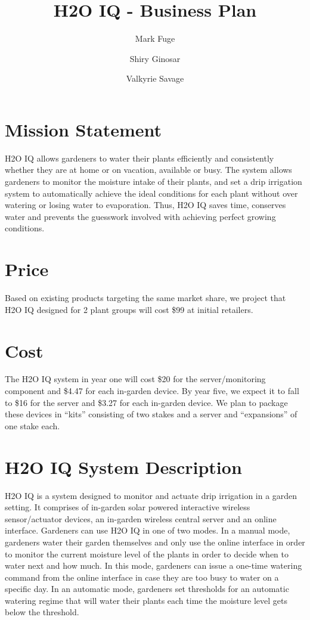 \documentclass[11pt]{article}
\begin{document}
\title{H2O IQ - Business Plan}
\author{Mark Fuge \and Shiry Ginosar \and Valkyrie Savage}

\maketitle

\section{Mission Statement}

H2O IQ allows gardeners to water their plants efficiently and consistently whether they are at home or on vacation, available or busy. The system allows gardeners to monitor the moisture intake of their plants, and set a drip irrigation system to automatically achieve the ideal conditions for each plant without over watering or losing water to evaporation. Thus, H2O IQ saves time, conserves water and prevents the guesswork involved with achieving perfect growing conditions.

\section{Price}

Based on existing products targeting the same market share, we project that H2O IQ designed for 2 plant groups will cost \$99 at initial retailers. 

\section{Cost}

The H2O IQ system in year one will cost \$20 for the server/monitoring component and \$4.47 for each in-garden device.  By year five, we expect it to fall to \$16 for the server and \$3.27 for each in-garden device.  We plan to package these devices in ``kits'' consisting of two stakes and a server and ``expansions'' of one stake each.

\section{H2O IQ System Description}

H2O IQ is a system designed to monitor and actuate drip irrigation in a garden setting. It comprises of in-garden solar powered interactive wireless sensor/actuator devices, an in-garden wireless central server and an online interface. Gardeners can use H2O IQ in one of two modes. In a manual mode, gardeners water their garden themselves and only use the online interface in order to monitor the current moisture level of the plants in order to decide when to water next and how much. In this mode, gardeners can issue a one-time watering command from the online interface in case they are too busy to water on a specific day. In an automatic mode, gardeners set thresholds for an automatic watering regime that will water their plants each time the moisture level gets below the threshold.
\end{document}
